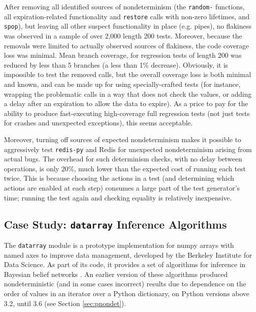 After removing all identified sources of nondeterminism (the {\tt random-} functions, all
expiration-related functionality and {\tt restore} calls with non-zero
lifetimes, and {\tt spop}), but leaving all other suspect functionality in
place (e.g. pipes), no flakiness was observed in a sample of over 2,000 length
200 tests.  Moreover, because the removals were limited to actually
observed sources of flakiness, the code coverage loss was minimal.
Mean branch coverage, for regression tests of length 200 was reduced
by less than 5 branches (a less than 1\% decrease).  Obviously, it is
impossible to test the removed calls, but the overall coverage loss is
both minimal and known, and can be made up for using specially-crafted
tests (for instance, wrapping the problematic calls in a way that does
not check the values, or adding a delay after an expiration to allow
the data to expire).  As a price to pay for the ability to produce
fast-executing high-coverage full regression tests (not just tests for
crashes and unexpected exceptions), this seems acceptable.

Moreover, turning off sources of expected nondeterminism makes
it possible to aggressively test {\tt redis-py} and Redis for
unexpected nondeterminism arising from actual bugs.  The overhead for such
determinism checks, with no delay between operations, is only
20\%, much lower than the expected cost of running each test twice.
This is because choosing the actions in a test (and determining which
actions are enabled at each step) consumes a large part of the test
generator's time; running the test again and checking equality is
relatively inexpensive.  

\subsection{Case Study: {\tt datarray} Inference Algorithms}

The {\tt datarray} module \cite{datarray} is a prototype
implementation for numpy arrays with named axes to improve data
management, developed by the Berkeley Institute for Data Science.  As part of its code, it provides a set of algorithms for
inference in
Bayesian belief networks \cite{russell2016artificial}.  An earlier
version of these algorithms produced nondeterministic (and in some
cases incorrect) results due to dependence on the order of values in
an iterator over a Python dictionary, on Python versions above 3.2, until 3.6 (see Section \ref{sec:pnondet}).

